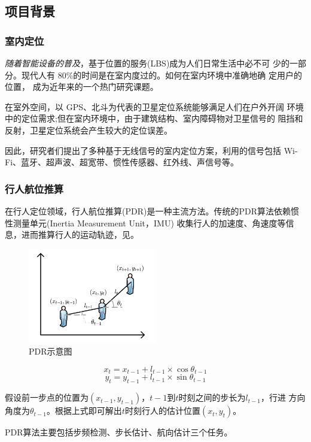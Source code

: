 \documentclass[a4paper]{article}
\begin{document}
\subsection{项目背景}
\subsubsection{室内定位}
\textit{随着智能设备的普及}，基于位置的服务(LBS)成为人们日常生活中必不可 少的一部分。现代人有 80\%的时间是在室内度过的。如何在室内环境中准确地确 定用户的位置，
成为近年来的一个热门研究课题。

在室外空间，以 GPS、北斗为代表的卫星定位系统能够满足人们在户外开阔 环境中的定位需求;但在室内环境中，由于建筑结构、室内障碍物对卫星信号的 阻挡和反射，卫星定位系统会产生较大的定位误差。

因此，研究者们提出了多种基于无线信号的室内定位方案，利用的信号包括 Wi-Fi、蓝牙、超声波、超宽带、惯性传感器、红外线、声信号等。

\subsubsection{行人航位推算}
在行人定位领域\cite{qbz}，行人航位推算(PDR\cite{li2019rmaptafa})是一种主流方法。传统的PDR算法依赖惯性测量单元(Inertia Measurement Unit，IMU)
收集行人的加速度、角速度等信息，进而推算行人的运动轨迹，见。

\begin{figure}[htbp]
	\centering
	\includegraphics[width=0.5\textwidth]{fig/pdr.png}
	\caption{PDR示意图}
	\label{pdrfig}
\end{figure}

$$ x_t = x_{t-1} + l_{t-1} \times \cos \theta_{t-1} $$
$$ y_t = y_{t-1} + l_{t-1} \times \sin \theta_{t-1} $$

假设前一步点的位置为$(x_{t-1},y_{t-1})$，$t-1$到$t$时刻之间的步长为$l_{t-1}$，行进
方向角度为$\theta_{t-1}$。根据上式即可解出$t$时刻行人的估计位置$(x_t, y_t)$。

PDR算法主要包括步频检测、步长估计、航向估计三个任务。
\end{document}
